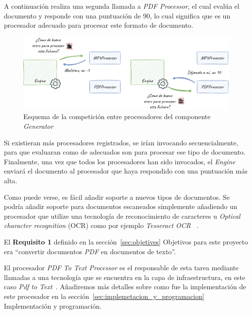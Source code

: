 A continuación realiza una segunda llamada a \textit{PDF Processor}, el cual evalúa el documento y responde con una
puntuación de 90, lo cual significa que es un procesador adecuado para procesar este formato de documento.

\begin{figure}[ht]
    \begin{center}
        \includegraphics[width=\textwidth]{./chapter/4/images/chapter_4.1.generator_component_processors}
        \caption{Esquema de la competición entre procesadores del componente \textit{Generator}}
        \label{fig:chapter_4.1.generator_component_processors}
    \end{center}
\end{figure}

Si existieran más procesadores registrados, se irían invocando secuencialmente, para que evaluaran como de adecuados
son para procesar ese tipo de documento.
Finalmente, una vez que todos los procesadores han sido invocados, el \textit{Engine} enviará el documento al procesador
que haya respondido con una puntuación más alta.

Como puede verse, es fácil añadir soporte a nuevos tipos de documentos.
Se podría añadir soporte para documentos escaneados simplemente añadiendo un procesador que utilize una tecnología
de reconocimiento de caracteres u \textit{Optical character recognition} (OCR) como por ejemplo \textit{Tesseract OCR}
~\cite{url_tesseract}.

El \textbf{Requisito 1} definido en la sección~\ref{sec:objetives} Objetivos para este proyecto era
``convertir documentos \textit{PDF} en documentos de texto''.

El procesador \textit{PDF To Text Processor} es el responsable de esta tarea mediante llamadas a una tecnología que se
encuentra en la capa de infraestructura, en este caso \textit{Pdf to Text}~\cite{url_pdftotextl}.
Añadiremos más detalles sobre como fue la implementación de este procesador en la
sección~\ref{sec:implemetacion_y_programacion} Implementación y programación.



